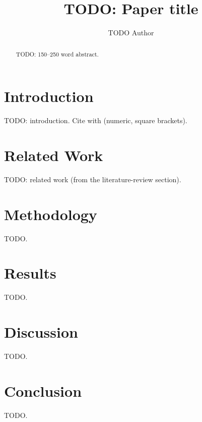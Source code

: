 \documentclass[sigconf,nonacm]{acmart}   %
\begin{document}
\title{TODO: Paper title}

\author{TODO Author}

\renewcommand{\shortauthors}{TODO Author}

\begin{abstract}
TODO: 150--250 word abstract. %
\end{abstract}


\maketitle

\section{Introduction}
TODO: introduction. Cite with \cite{example2024} (numeric, square brackets).

\section{Related Work}
TODO: related work (from the literature-review section).

\section{Methodology}
TODO.

\section{Results}
TODO.

\section{Discussion}
TODO.

\section{Conclusion}
TODO.



\end{document}
